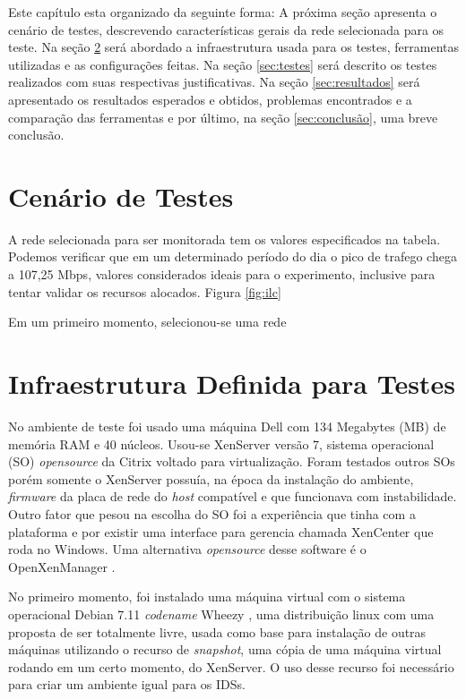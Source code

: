 \documentclass[
	12pt,				
	openright,		
	twoside,	
	a4paper,
	english,	
	brazil	
	]{abntex2}
\begin{document}
Este capítulo esta organizado da seguinte forma: A próxima seção apresenta o cenário de testes, descrevendo características gerais da rede selecionada para os teste. Na seção \ref{sec:infraestrutura} será abordado a infraestrutura usada para os testes, ferramentas utilizadas e as configurações feitas. Na seção \ref{sec:testes} será descrito os testes realizados com suas respectivas justificativas. Na seção \ref{sec:resultados} será apresentado os resultados esperados e obtidos, problemas encontrados e a comparação das ferramentas e por último, na seção \ref{sec:conclusão}, uma breve conclusão.

\section{Cenário de Testes} \label{sec:cenário}

A rede selecionada para ser monitorada tem os valores especificados na tabela. Podemos verificar que em um determinado período do dia o pico de trafego chega a 107,25 Mbps, valores considerados ideais para o experimento, inclusive para tentar validar os recursos alocados. Figura \ref{fig:ilc}

Em um primeiro momento, selecionou-se uma rede

\section{Infraestrutura Definida para Testes} \label{sec:infraestrutura}

No ambiente de teste foi usado uma máquina Dell com 134 Megabytes (MB) de memória RAM e 40 núcleos. Usou-se XenServer \cite{xenserver} versão 7, sistema operacional (SO) \textit{opensource} da Citrix voltado para virtualização. Foram testados outros SOs porém somente o XenServer possuía, na época da instalação do ambiente, \textit{firmware} da placa de rede do \textit{host} compatível e que funcionava com instabilidade. Outro fator que pesou na escolha do SO foi a experiência que tinha com a plataforma e por existir uma interface para gerencia chamada XenCenter que roda no Windows. Uma alternativa \textit{opensource} desse software é o OpenXenManager \cite{openxenmanager}.

No primeiro momento, foi instalado uma máquina virtual com o sistema operacional Debian 7.11 \textit{codename} Wheezy \cite{debianwheezy}, uma distribuição linux com uma proposta de ser totalmente livre, usada como base para instalação de outras máquinas utilizando o recurso de \textit{snapshot}, uma cópia de uma máquina virtual rodando em um certo momento, do XenServer. O uso desse recurso foi necessário para criar um ambiente igual para os IDSs.
\end{document}

